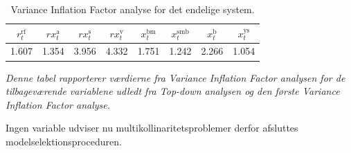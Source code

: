 \documentclass[
  a4paper,
  oneside]{memoir}
\begin{document}
\begin{table}[H]

\caption{\label{tab:VIF-TAB-PROD}Variance Inflation Factor analyse for det endelige system.}
\centering
\begin{threeparttable}
\begin{tabular}[t]{cccccccc}
\toprule
$r_t^{\text{rf}}$ & $rx_t^{\text{a}}$ & $rx_t^{\text{s}}$ & $rx_t^{\text{v}}$ & $x_t^{\text{bm}}$ & $x_t^{\text{smb}}$ & $x_t^{\text{b}}$ & $x_t^{\text{ys}}$\\
\midrule
\rowcolor{gray!6}  1.607 & 1.354 & 3.956 & 4.332 & 1.751 & 1.242 & 2.266 & 1.054\\
\bottomrule
\end{tabular}
\begin{tablenotes}
\item \textit{Denne tabel rapporterer værdierne fra \textit{Variance Inflation Factor} analysen for de tilbageværende variablene udledt fra \textit{Top-down} analysen og den første \textit{Variance Inflation Factor} analyse.}
\end{tablenotes}
\end{threeparttable}
\end{table}

Ingen variable udviser nu multikollinaritetsproblemer derfor afsluttes modelselektionsproceduren.
\end{document}
